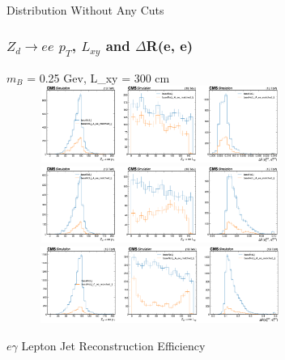 \documentclass{beamer}
\begin{document}
 \begin{frame}
    \frametitle{}
    \Huge
    Distribution Without Any Cuts
\end{frame}
\begin{frame}
   \frametitle{$Z_d \rightarrow ee$ $p_T$, $L_{xy}$ and $\Delta$R(e, e)}

   \centering
   \textcolor{uvaorange}{$m_{B}$ = 0.25 Gev, L_{xy} = 300 cm}\\
    \includegraphics[width=10cm, height=2.5cm]{../sidm_files/ljRecoEffi/zd_ee_200_0p25.png}\\
    \includegraphics[width=10cm, height=2.5cm]{../sidm_files/ljRecoEffi/zd_ee_200_1p2.png}\\
    \includegraphics[width=10cm, height=2.5cm]{../sidm_files/ljRecoEffi/zd_ee_200_5.png}\\


\end{frame}
\begin{frame}
    \centering
    \Huge
    $e\gamma$ Lepton Jet Reconstruction Efficiency
\end{frame}
\end{document}
